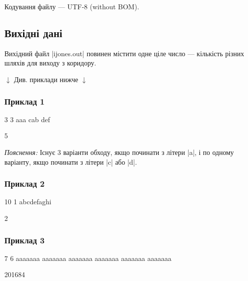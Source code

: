 \documentclass[12pt,a4paper]{article}
\begin{document}
Кодування файлу --- UTF-8 (without BOM).


\subsection*{Вихідні дані}

Вихідний файл |ijones.out| повинен містити одне ціле число --- кількість різних шляхів для виходу з коридору.


\begin{pagebottomtext}
$\downarrow$ Див. приклади нижче $\downarrow$
\end{pagebottomtext}


\pagebreak


\subsubsection*{Приклад 1}

\textbf{}

\begin{codeblock}
3 3
aaa
cab
def
\end{codeblock}

\textbf{}

\begin{codeblock}
5
\end{codeblock}

\emph{Пояснення:} Існує 3 варіанти обходу, якщо починати з літери |a|, і по одному варіанту, якщо починати з літери |c| або |d|.


\subsubsection*{Приклад 2}

\textbf{}

\begin{codeblock}
10 1
abcdefaghi
\end{codeblock}

\textbf{}

\begin{codeblock}
2
\end{codeblock}


\subsubsection*{Приклад 3}

\textbf{}

\begin{codeblock}
7 6
aaaaaaa
aaaaaaa
aaaaaaa
aaaaaaa
aaaaaaa
aaaaaaa
\end{codeblock}

\textbf{}

\begin{codeblock}
201684
\end{codeblock}
\end{document}
